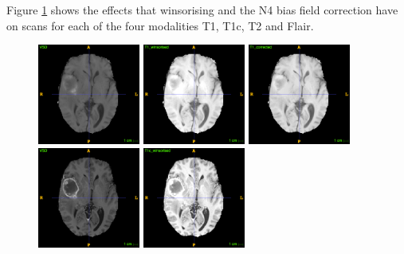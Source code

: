 \documentclass[12pt,a4paper,twoside,openright]{report}
\begin{document}
Figure \ref{fig:n4itk_example} shows the effects that winsorising and the N4 bias field correction have on scans for each of the four modalities T1, T1c, T2 and Flair.
\begin{figure}
	\centering
	\label{fig:n4itk_example}
	\includegraphics[width=0.3\textwidth]{t1_no_norm_example}
	\includegraphics[width=0.3\textwidth]{t1_winsorized_example}
	\includegraphics[width=0.3\textwidth]{t1_n4itk_example} \\
	\vspace{0.5cm}
	\includegraphics[width=0.3\textwidth]{t1c_no_norm_example}
	\includegraphics[width=0.3\textwidth]{t1c_winsorized_example}

\end{figure}
\end{document}
